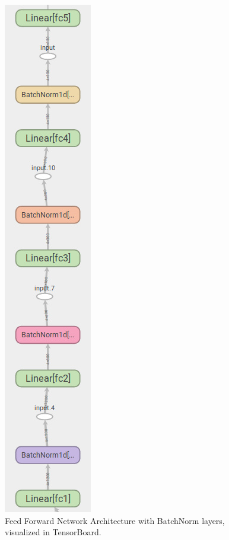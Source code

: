 \documentclass[12pt]{article}
\theoremstyle{definition}
\DeclareRobustCommand{\[}{\begin{equation}}
\DeclareRobustCommand{\]}{\end{equation}}
\begin{document}
\begin{minipage}{0.4\linewidth}
\begin{figure}[H]
\includegraphics[width=0.5\linewidth]{FFN.jpg}
\caption{\label{fig:FFN} Feed Forward Network Architecture with BatchNorm layers, visualized in TensorBoard.}
\end{figure}
\end{minipage} \hfill
\end{document}
